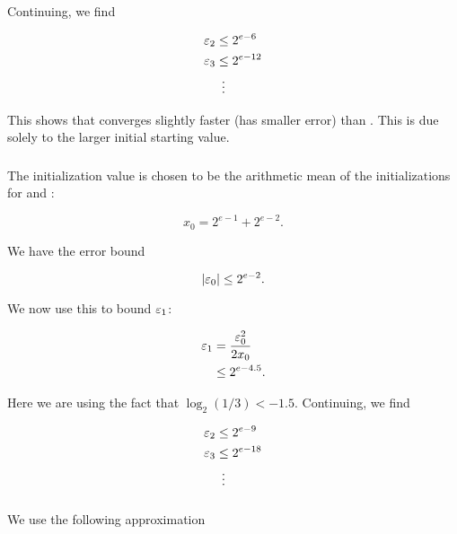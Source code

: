\noindent
Continuing, we find

\begin{align}
    \varepsilon_{2} &\le 2^{e-6} \nonumber\\
    \varepsilon_{3} &\le 2^{e-12} \nonumber\\
        &\ \vdots
\end{align}

\noindent
This shows that \UnrolledTwo{} converges slightly faster (has smaller error)
than \UnrolledOne{}.
This is due solely to the larger initial starting value.


\subsubsection{\UnrolledThree{}}
\label{app:error_bounds:unrolled3}

The initialization value is chosen to be the arithmetic mean
of the initializations for \UnrolledOne{} and \UnrolledTwo{}:

\begin{equation}
    x_{0} = 2^{e-1} + 2^{e-2}.
\end{equation}

\noindent
We have the error bound

\begin{equation}
    \left| \varepsilon_{0} \right| \le 2^{e-2}.
\end{equation}

\noindent
We now use this to bound $\varepsilon_{1}$:

\begin{align}
    \varepsilon_{1} &= \frac{\varepsilon_{0}^{2}}{2x_{0}} \nonumber\\
        &\le 2^{e-4.5}.
\end{align}

\noindent
Here we are using the fact that $\log_{2}(1/3) < -1.5$.
Continuing, we find

\begin{align}
    \varepsilon_{2} &\le 2^{e-9} \nonumber\\
    \varepsilon_{3} &\le 2^{e-18} \nonumber\\
        &\ \vdots
\end{align}


\subsubsection{\BitLength{}}
\label{app:error_bounds:bitlength}

We use the following approximation

